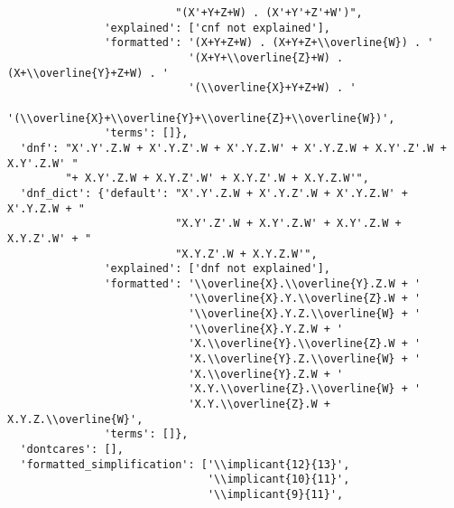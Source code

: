 \begin{verbatim}
                          "(X'+Y+Z+W) . (X'+Y'+Z'+W')",
               'explained': ['cnf not explained'],
               'formatted': '(X+Y+Z+W) . (X+Y+Z+\\overline{W}) . '
                            '(X+Y+\\overline{Z}+W) . (X+\\overline{Y}+Z+W) . '
                            '(\\overline{X}+Y+Z+W) . '
                            '(\\overline{X}+\\overline{Y}+\\overline{Z}+\\overline{W})',
               'terms': []},
  'dnf': "X'.Y'.Z.W + X'.Y.Z'.W + X'.Y.Z.W' + X'.Y.Z.W + X.Y'.Z'.W + X.Y'.Z.W' "
         "+ X.Y'.Z.W + X.Y.Z'.W' + X.Y.Z'.W + X.Y.Z.W'",
  'dnf_dict': {'default': "X'.Y'.Z.W + X'.Y.Z'.W + X'.Y.Z.W' + X'.Y.Z.W + "
                          "X.Y'.Z'.W + X.Y'.Z.W' + X.Y'.Z.W + X.Y.Z'.W' + "
                          "X.Y.Z'.W + X.Y.Z.W'",
               'explained': ['dnf not explained'],
               'formatted': '\\overline{X}.\\overline{Y}.Z.W + '
                            '\\overline{X}.Y.\\overline{Z}.W + '
                            '\\overline{X}.Y.Z.\\overline{W} + '
                            '\\overline{X}.Y.Z.W + '
                            'X.\\overline{Y}.\\overline{Z}.W + '
                            'X.\\overline{Y}.Z.\\overline{W} + '
                            'X.\\overline{Y}.Z.W + '
                            'X.Y.\\overline{Z}.\\overline{W} + '
                            'X.Y.\\overline{Z}.W + X.Y.Z.\\overline{W}',
               'terms': []},
  'dontcares': [],
  'formatted_simplification': ['\\implicant{12}{13}',
                               '\\implicant{10}{11}',
                               '\\implicant{9}{11}',

\end{verbatim}
